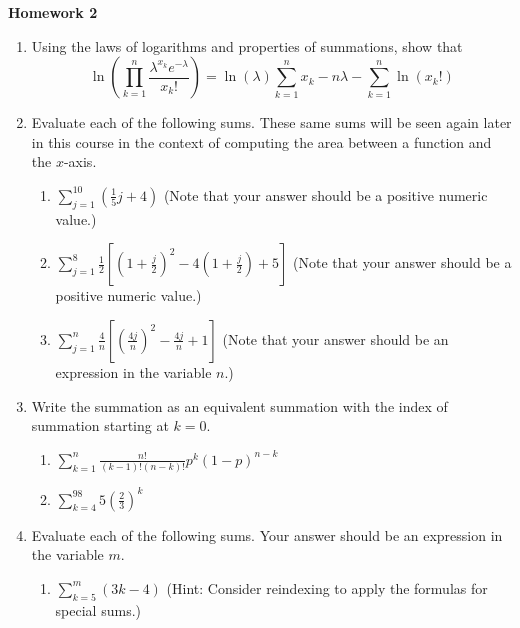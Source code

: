 \documentclass{article}
\begin{document}
    
    \begin{center}
        \large \textbf{Homework 2}
    \end{center}
                    \begin{enumerate}
                        \item Using the laws of logarithms and properties of summations, show that $$\ln\left(\prod_{k=1}^n \frac{\lambda^{x_k}e^{-\lambda}}{x_k!}\right)=\ln(\lambda)\sum_{k=1}^n x_k -n\lambda - \sum_{k=1}^n \ln(x_k!)$$
                        \item Evaluate each of the following sums.  These same sums will be seen again later in this course in the context of computing the area between a function and the $x$-axis.
                            \begin{enumerate}
                                \item $ \sum_{j=1}^{10} \left(\frac{1}{5}j+4\right)$  (Note that your answer should be a positive numeric value.)
                                \item $ \sum_{j=1}^{8} \frac{1}{2}\left[\left(1+\frac{j}{2} \right)^2 -4\left( 1+ \frac{j}{2}\right) + 5\right]$  (Note that your answer should be a positive numeric value.)
                                \item $ \sum_{j=1}^{n} \frac{4}{n}\left[ \left(\frac{4j}{n}\right)^2 - \frac{4j}{n} + 1 \right]$  (Note that your answer should be an expression in the variable $n$.)
                            \end{enumerate}
                        \item Write the summation as an equivalent summation with the index of summation starting at $k=0$.
                            \begin{enumerate}
                                \item $ \sum_{k=1}^n \frac{n!}{(k-1)!(n-k)!}p^k(1-p)^{n-k}$
                                \item $ \sum_{k=4}^{98} 5\left(\frac{2}{3}\right) ^k$
                            \end{enumerate}
                        \item Evaluate each of the following sums.  Your answer should be an expression in the variable $m$.
                            \begin{enumerate}
                                \item $ \sum_{k=5}^{m} (3k-4)$  (Hint: Consider reindexing to apply the formulas for special sums.)

\end{enumerate}
\end{enumerate}
\end{document}
